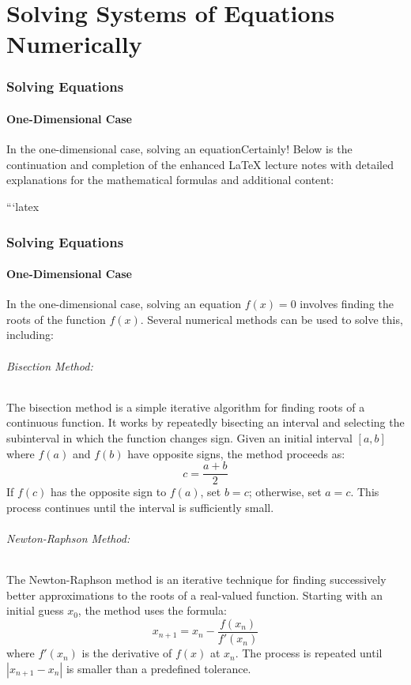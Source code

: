 \documentclass[12pt]{article}
\begin{document}
\part{Solving Systems of Equations Numerically}
\section{Solving Equations}
\subsection{One-Dimensional Case}
In the one-dimensional case, solving an equationCertainly! Below is the continuation and completion of the enhanced LaTeX lecture notes with detailed explanations for the mathematical formulas and additional content:

```latex
\section{Solving Equations}
\subsection{One-Dimensional Case}
In the one-dimensional case, solving an equation \( f(x) = 0 \) involves finding the roots of the function \( f(x) \). Several numerical methods can be used to solve this, including:

\paragraph{Bisection Method:}
The bisection method is a simple iterative algorithm for finding roots of a continuous function. It works by repeatedly bisecting an interval and selecting the subinterval in which the function changes sign. Given an initial interval \([a, b]\) where \( f(a) \) and \( f(b) \) have opposite signs, the method proceeds as:
\[
c = \frac{a + b}{2}
\]
If \( f(c) \) has the opposite sign to \( f(a) \), set \( b = c \); otherwise, set \( a = c \). This process continues until the interval is sufficiently small.

\paragraph{Newton-Raphson Method:}
The Newton-Raphson method is an iterative technique for finding successively better approximations to the roots of a real-valued function. Starting with an initial guess \( x_0 \), the method uses the formula:
\[
x_{n+1} = x_n - \frac{f(x_n)}{f'(x_n)}
\]
where \( f'(x_n) \) is the derivative of \( f(x) \) at \( x_n \). The process is repeated until \( |x_{n+1} - x_n| \) is smaller than a predefined tolerance.
\end{document}
